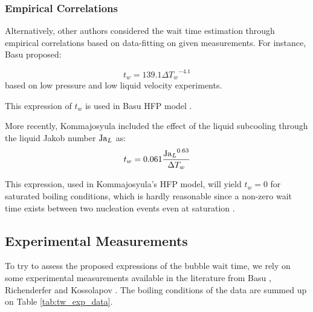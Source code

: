 \subsubsection{Empirical Correlations}

Alternatively, other authors considered the wait time estimation through empirical correlations based on data-fitting on given measurements. For instance, Basu \etal \cite{basu_wall_2005} proposed:

\begin{equation}
t_{w} = 139.1\Delta {T_{w}}^{-4.1}
\end{equation}
based on low pressure and low liquid velocity experiments.

\begin{note*}{}
This expression of $t_{w}$ is used in Basu \etal HFP model \cite{basu_wall_2005}.
\end{note*}


\npar

More recently, Kommajosyula \cite{kommajosyula_development_2020} included the effect of the liquid subcooling through the liquid Jakob number $\mathrm{Ja}_{L}$ as:
\begin{equation}
t_{w} = 0.061\frac{{\mathrm{Ja}_{L}}^{0.63}}{\Delta T_{w}}
\end{equation}

\begin{remark*}
This expression, used in Kommajosyula's HFP model, will yield $t_{w}=0$ for saturated boiling conditions, which is hardly reasonable since a non-zero wait time exists between two nucleation events even at saturation \cite{gerardi_study_2010}.
\end{remark*}



\subsection{Experimental Measurements}

To try to assess the proposed expressions of the bubble wait time, we rely on some experimental measurements available in the literature from Basu \etal \cite{basu_wall_2005}, Richenderfer \cite{richenderfer_experimental_2018} and Kossolapov \cite{kossolapov_experimental_2021}. The boiling conditions of the data are summed up on Table \ref{tab:tw_exp_data}.

